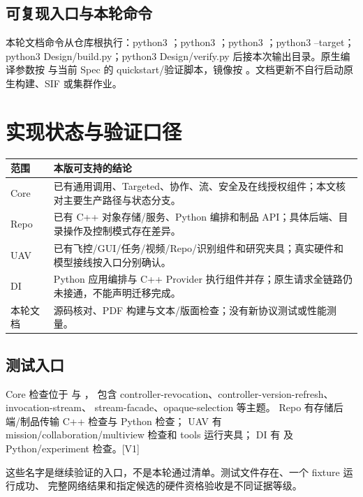\subsection{可复现入口与本轮命令}
本轮文档命令从仓库根执行：python3 ；python3 ；python3 ；python3  --target；python3 Design/build.py；python3 Design/verify.py 后接本次输出目录。原生编译参数按  与当前 Spec 的 quickstart/验证脚本，镜像按 。文档更新不自行启动原生构建、SIF 或集群作业。

\newpage

\section{实现状态与验证口径}
\begin{tabularx}{\linewidth}{@{}p{27mm}X@{}}
\toprule
范围 & 本版可支持的结论 \\
\midrule
Core & 已有通用调用、Targeted、协作、流、安全及在线授权组件；本文核对主要生产路径与状态分支。\\
Repo & 已有 C++ 对象存储/服务、Python 编排和制品 API；具体后端、目录操作及控制模式存在差异。\\
UAV & 已有飞控/GUI/任务/视频/Repo/识别组件和研究夹具；真实硬件和模型接线按入口分别确认。\\
DI & Python 应用编排与 C++ Provider 执行组件并存；原生请求全链路仍未接通，不能声明迁移完成。\\
本轮文档 & 源码核对、PDF 构建与文本/版面检查；没有新协议测试或性能测量。\\
\bottomrule
\end{tabularx}

\subsection{测试入口}
Core 检查位于  与 ，
包含 controller-revocation、controller-version-refresh、invocation-stream、
stream-facade、opaque-selection 等主题。
Repo 有存储后端/制品传输 C++ 检查与  Python 检查；
UAV 有 mission/collaboration/multiview 检查和 tools 运行夹具；
DI 有  及 Python/experiment 检查。[V1]

这些名字是继续验证的入口，不是本轮通过清单。测试文件存在、一个 fixture 运行成功、
完整网络结果和指定候选的硬件资格验收是不同证据等级。

